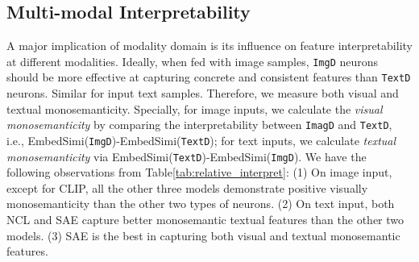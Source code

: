 \subsection{Multi-modal Interpretability}

A major implication of modality domain is its influence on feature interpretability at different modalities. Ideally, when fed with image samples, \texttt{ImgD} neurons should be more effective at capturing concrete and consistent features than \texttt{TextD} neurons. Similar for input text samples. Therefore, we measure both visual and textual monosemanticity. Specially, for image inputs, we calculate the \textsl{visual monosemanticity} by comparing the interpretability between \texttt{ImagD} and \texttt{TextD}, i.e., EmbedSimi(\texttt{ImgD})-EmbedSimi(\texttt{TextD}); for text inputs, we calculate \textsl{textual monosemanticity} via EmbedSimi(\texttt{TextD})-EmbedSimi(\texttt{ImgD}). We have the following observations from Table\ref{tab:relative_interpret}: (1) On image input, except for CLIP, all the other three models demonstrate positive visually monosemanticity than the other two types of neurons. (2) On text input, both NCL and SAE capture better monosemantic textual features than the other two models. (3) SAE is the best in capturing both visual and textual monosemantic features. 



